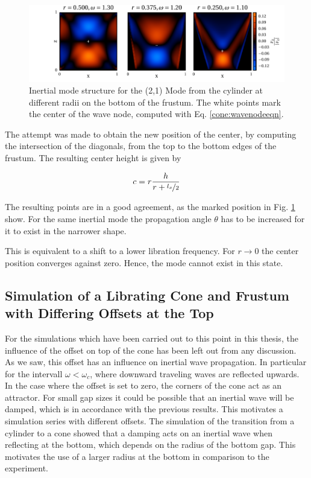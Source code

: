 \begin{figure}[!b]
  \centering
  \includegraphics{gfx/cone/transition/phase.pdf}
  \caption{\label{fig:cone:phase}
    Inertial mode structure for the (2,1) Mode from the cylinder at different radii on the bottom of the frustum.
    The white points mark the center of the wave node, computed with Eq.  \ref{cone:wavenodeeqn}.
  }
\end{figure}

The attempt was made to obtain the new position of the center,
by computing the intersection of the diagonals, from the top to the bottom edges of the frustum.
The resulting center height is given by

\begin{align}
\label{cone:wavenodeeqn}
c  = r \frac{h}{r+\nicefrac{l_x}{2}}
\end{align}

The resulting points are in a good agreement, as the marked position in Fig. \ref{fig:cone:phase} show.
For the same inertial mode the propagation angle $\theta$ has to be
increased for it to exist in the narrower shape.

This is equivalent to a shift to a lower libration frequency.
For $r \rightarrow 0$ the center position converges against zero. Hence, the mode cannot exist in this state.

\subsection{Simulation of a Librating Cone and Frustum with Differing Offsets at the Top}

For the simulations which have been carried out to this point in this thesis,
the influence of the offset on top of the cone has been left out from any discussion.
As we saw, this offset has an influence on inertial wave propagation.
In particular for the intervall $\omega<\omega_c$, where  downward traveling waves are
reflected upwards.
In the case where the offset is set to zero, the corners of the cone act as an attractor.
For small gap sizes it could be possible that an inertial wave will be damped,
which is in accordance with the previous results.
This motivates a simulation series with different offsets.
The simulation of the transition from a cylinder to a cone showed
that a damping acts on an inertial wave when reflecting at the bottom,
which  depends on the radius of the bottom gap.
This motivates the use of a larger radius at the bottom in comparison to the experiment.

